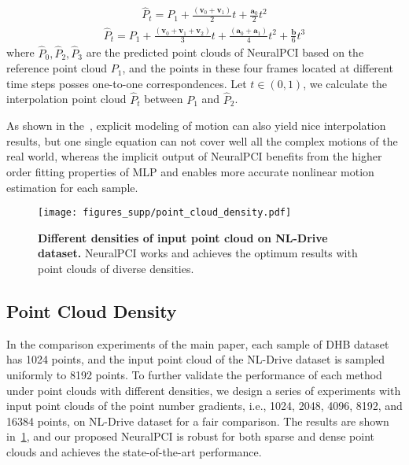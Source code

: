 \documentclass[10pt,twocolumn,letterpaper]{article}
\begin{document}
\vspace{-.5cm}
\begin{equation}
\label{eq:explicit quadratic}
\begin{split}
     \hat{P}_{t} = P_{1} + \frac{\left( \boldsymbol{v}_{0} + \boldsymbol{v}_{1} \right)}{2} t + \frac{\boldsymbol{a}_{0}}{2}  t^{2}
\end{split}
\end{equation}
\vspace{-.5cm}
\begin{equation}
\label{eq:explicit cubic}
\begin{split}
    \hat{P}_{t} = P_{1} + \frac{\left( \boldsymbol{v}_{0} + \boldsymbol{v}_{1} + \boldsymbol{v}_{2} \right)}{3} t + \frac{\left( \boldsymbol{a}_{0} + \boldsymbol{a}_{1} \right)}{4} t^{2} + \frac{\boldsymbol{b}}{6} t^{3}
\end{split}
\end{equation}
where $\hat{P}_{0}, \hat{P}_{2}, \hat{P}_{3}$ are the predicted point clouds of NeuralPCI based on the reference point cloud $P_{1}$, and the points in these four frames located at different time steps posses one-to-one correspondences. Let $t \in (0, 1) $, we calculate the interpolation point cloud $\hat{P}_{t}$ between $P_{1}$ and $\hat{P}_{2}$.


As shown in the~, explicit modeling of motion can also yield nice interpolation results, but one single equation can not cover well all the complex motions of the real world, whereas the implicit output of NeuralPCI benefits from the higher order fitting properties of MLP and enables more accurate nonlinear motion estimation for each sample.




\begin{figure}[t]
\centering
  \texttt{[image: figures\_supp/point\_cloud\_density.pdf]}
  \caption{\textbf{Different densities of input point cloud on NL-Drive dataset.} NeuralPCI works and achieves the optimum results with point clouds of diverse densities.}
  \label{fig:point_cloud_density}
\end{figure} 



\subsection{Point Cloud Density}

In the comparison experiments of the main paper, each sample of DHB dataset has 1024 points, and the input point cloud of the NL-Drive dataset is sampled uniformly to 8192 points. To further validate the performance of each method under point clouds with different densities, we design a series of experiments with input point clouds of the point number gradients, i.e., 1024, 2048, 4096, 8192, and 16384 points, on NL-Drive dataset for a fair comparison. The results are shown in~\cref{fig:point_cloud_density}, and our proposed NeuralPCI is robust for both sparse and dense point clouds and achieves the state-of-the-art performance.
\end{document}
